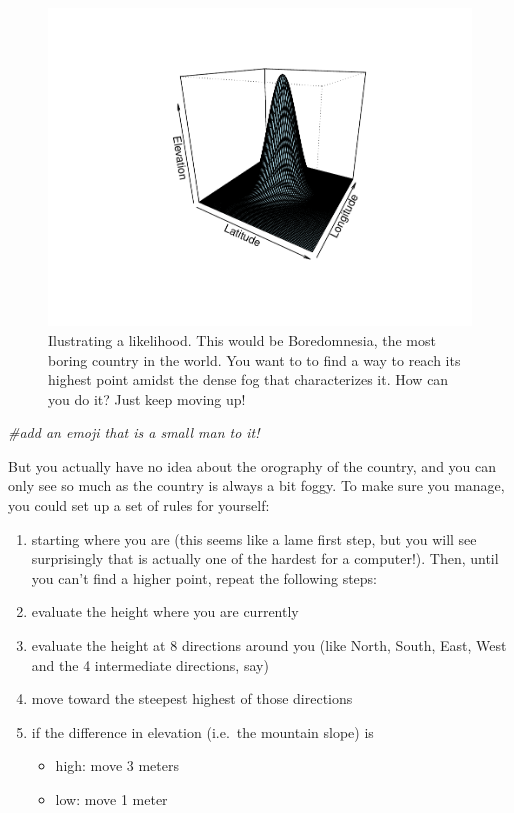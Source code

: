 \documentclass[
]{book}
\newenvironment{Shaded}{\begin{snugshade}}{\end{snugshade}}
\newcommand{\CommentTok}[1]{\textcolor[rgb]{0.56,0.35,0.01}{\textit{#1}}}
\providecommand{\tightlist}{%
  \setlength{\itemsep}{0pt}\setlength{\parskip}{0pt}}
\begin{document}
\begin{figure}

{\centering \includegraphics[width=0.8\linewidth]{ECOMODbook_files/figure-latex/country-1} 

}

\caption{Ilustrating a likelihood. This would be Boredomnesia, the most boring country in the world. You want to to find a way to reach its highest point amidst the dense fog that characterizes it. How can you do it? Just keep moving up!}\label{fig:country}
\end{figure}

\begin{Shaded}
\begin{Highlighting}[]
\CommentTok{#add an emoji that is a small man to it!}
\end{Highlighting}
\end{Shaded}

But you actually have no idea about the orography of the country, and you can only see so much as the country is always a bit foggy. To make sure you manage, you could set up a set of rules for yourself:

\begin{enumerate}
\def\labelenumi{\arabic{enumi}.}
\tightlist
\item
  starting where you are (this seems like a lame first step, but you will see surprisingly that is actually one of the hardest for a computer!). Then, until you can't find a higher point, repeat the following steps:
\item
  evaluate the height where you are currently
\item
  evaluate the height at 8 directions around you (like North, South, East, West and the 4 intermediate directions, say)
\item
  move toward the steepest highest of those directions
\item
  if the difference in elevation (i.e.~the mountain slope) is

  \begin{itemize}
  \tightlist
  \item
    high: move 3 meters
  \item
    low: move 1 meter
  \end{itemize}
\end{enumerate}
\end{document}
